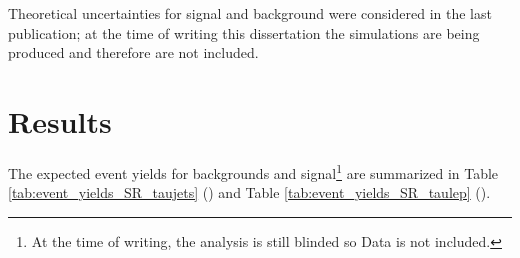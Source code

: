 		Theoretical uncertainties for signal and \ttbar background were considered in the last publication; at the time of writing this dissertation the simulations are being produced and therefore are not included. 


	\section{Results}\label{sec:results}
		The expected event yields for backgrounds and signal\footnote{At the time of writing, the analysis is still blinded so Data is not included.} are summarized in Table \ref{tab:event_yields_SR_taujets} (\taujets) and Table \ref{tab:event_yields_SR_taulep} (\taulep).


